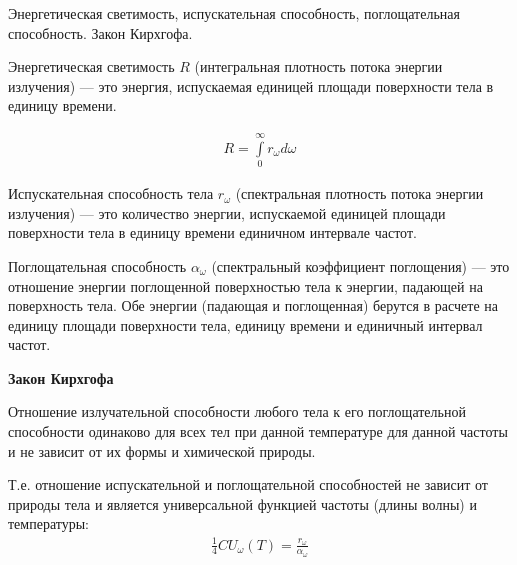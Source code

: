 \documentclass[__main__.tex]{subfiles}
\begin{document}
Энергетическая светимость, испускательная способность, поглощательная способность. Закон Кирхгофа.\\ 

\begin{definition}
Энергетическая светимость $R$ (интегральная плотность потока энергии излучения) — это энергия, испускаемая единицей площади поверхности тела в единицу времени.
\end{definition}
\begin{gather*}
R= \int\limits_0^\infty r_\omega d\omega
\end{gather*}

\begin{definition}
Испускательная способность тела $r_\omega$ (спектральная плотность потока энергии излучения) — это количество энергии, испускаемой единицей площади поверхности тела в единицу времени единичном интервале частот.
\end{definition}

\begin{definition}
Поглощательная способность $\alpha_\omega$ (спектральный коэффициент поглощения) —
это отношение энергии поглощенной поверхностью тела к энергии, падающей на поверхность тела. Обе энергии (падающая и поглощенная) берутся в расчете на единицу площади поверхности тела, единицу времени и единичный интервал частот.
\end{definition}
\textbf{Закон Кирхгофа}
\begin{statement}
Отношение излучательной способности любого тела к его поглощательной способности одинаково для всех тел при данной температуре для данной частоты и не зависит от их формы и химической природы.
\end{statement}
Т.е. отношение испускательной и поглощательной способностей не зависит от природы тела и является универсальной функцией частоты (длины волны) и температуры:
\begin{gather*}
\frac{1}{4}CU_\omega(T)=\frac{r_\omega}{\alpha_\omega}
\end{gather*}
\end{document}

